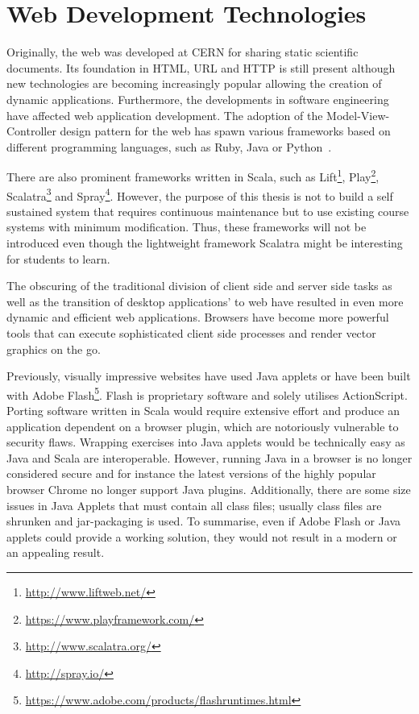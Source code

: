 \chapter{Web Development Technologies} 
\label{chapter:web}

Originally, the web was developed at CERN for sharing static scientific documents. Its foundation in HTML, URL and HTTP is still present although new technologies are becoming increasingly popular allowing the creation of dynamic applications. Furthermore, the developments in software engineering have affected web application development. The adoption of the Model-View-Controller design pattern for the web has spawn various frameworks based on different programming languages, such as Ruby, Java or Python~\cite{jazayeri:2007}.

There are also prominent frameworks written in Scala, such as Lift\footnote{ \url{http://www.liftweb.net/}}, Play\footnote{ \url{https://www.playframework.com/}}, Scalatra\footnote{ \url{http://www.scalatra.org/}} and Spray\footnote{ \url{http://spray.io/}}. However, the purpose of this thesis is not to build a self sustained system that requires continuous maintenance but to use existing course systems with minimum modification. Thus, these frameworks will not be introduced even though the lightweight framework Scalatra might be interesting for students to learn.

The obscuring of the traditional division of client side and server side tasks as well as the transition of desktop applications' to web have resulted in even more dynamic and efficient web applications. Browsers have become more powerful tools that can execute sophisticated client side processes and render vector graphics on the go.~\cite{jazayeri:2007}

Previously, visually impressive websites have used Java applets or have been built with Adobe Flash\footnote{ \url{https://www.adobe.com/products/flashruntimes.html}}. Flash is proprietary software and solely utilises ActionScript. Porting software written in Scala would require extensive effort and produce an application dependent on a browser plugin, which are notoriously vulnerable to security flaws. Wrapping exercises into Java applets would be technically easy as Java and Scala are interoperable. However, running Java in a browser is no longer considered secure and for instance the latest versions of the highly popular browser Chrome no longer support Java plugins. Additionally, there are some size issues in Java Applets that must contain all class files; usually class files are shrunken and jar-packaging is used. To summarise, even if Adobe Flash or Java applets could provide a working solution, they would not result in a modern or an appealing result.

